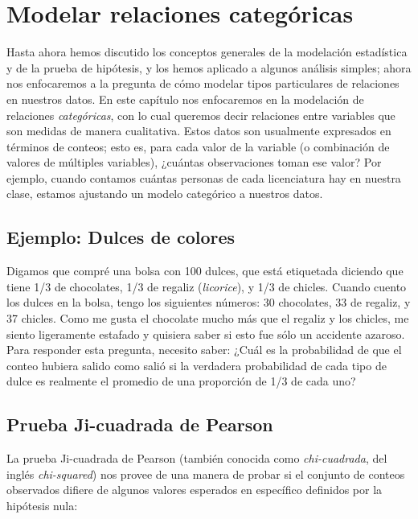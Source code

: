\documentclass[
  12pt,
]{book}
\begin{document}
\hypertarget{modeling-categorical-relationships}{%
\chapter{Modelar relaciones categóricas}\label{modeling-categorical-relationships}}

Hasta ahora hemos discutido los conceptos generales de la modelación estadística y de la prueba de hipótesis, y los hemos aplicado a algunos análisis simples; ahora nos enfocaremos a la pregunta de cómo modelar tipos particulares de relaciones en nuestros datos. En este capítulo nos enfocaremos en la modelación de relaciones \emph{categóricas}, con lo cual queremos decir relaciones entre variables que son medidas de manera cualitativa. Estos datos son usualmente expresados en términos de conteos; esto es, para cada valor de la variable (o combinación de valores de múltiples variables), ¿cuántas observaciones toman ese valor? Por ejemplo, cuando contamos cuántas personas de cada licenciatura hay en nuestra clase, estamos ajustando un modelo categórico a nuestros datos.

\hypertarget{ejemplo-dulces-de-colores}{%
\section{Ejemplo: Dulces de colores}\label{ejemplo-dulces-de-colores}}

Digamos que compré una bolsa con 100 dulces, que está etiquetada diciendo que tiene 1/3 de chocolates, 1/3 de regaliz (\emph{licorice}), y 1/3 de chicles. Cuando cuento los dulces en la bolsa, tengo los siguientes números: 30 chocolates, 33 de regaliz, y 37 chicles. Como me gusta el chocolate mucho más que el regaliz y los chicles, me siento ligeramente estafado y quisiera saber si esto fue sólo un accidente azaroso. Para responder esta pregunta, necesito saber: ¿Cuál es la probabilidad de que el conteo hubiera salido como salió si la verdadera probabilidad de cada tipo de dulce es realmente el promedio de una proporción de 1/3 de cada uno?

\hypertarget{chi-squared-test}{%
\section{Prueba Ji-cuadrada de Pearson}\label{chi-squared-test}}

La prueba Ji-cuadrada de Pearson (también conocida como \emph{chi-cuadrada}, del inglés \emph{chi-squared}) nos provee de una manera de probar si el conjunto de conteos observados difiere de algunos valores esperados en específico definidos por la hipótesis nula:
\end{document}
